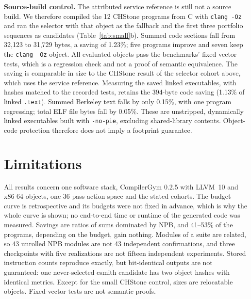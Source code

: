 \documentclass[conference,a4paper]{IEEEtran}
\begin{document}
\textbf{Source-build control.} The attributed service reference is
still not a source build. We therefore compiled the 12 CHStone programs
from C with \texttt{clang -Oz} and ran the selector with that object as
the fallback and the first three portfolio sequences as candidates
(Table~\ref{tab:small}b). Summed code sections fall from 32,123 to
31,729 bytes, a saving of 1.23\%; five programs improve and seven keep
the \texttt{clang -Oz} object. All evaluated objects pass the
benchmarks' fixed-vector tests, which is a regression check and not a
proof of semantic equivalence. The saving is comparable in size to the
CHStone result of the selector cohort above, which uses the service
reference. Measuring the saved linked executables, with hashes matched
to the recorded tests, retains the 394-byte code saving (1.13\% of linked
\texttt{.text}). Summed Berkeley text falls by only 0.15\%, with one
program regressing; total ELF file bytes fall by 0.05\%. These are
unstripped, dynamically linked executables built with \texttt{-no-pie},
excluding shared-library contents. Object-code protection therefore
does not imply a footprint guarantee.

\section{Limitations}
All results concern one software stack, CompilerGym 0.2.5 with LLVM~10
and x86-64 objects, one 36-pass action space and the stated cohorts.
The budget curve is retrospective and its budgets were not fixed in
advance, which is why the whole curve is shown; no end-to-end time or
runtime of the generated code was measured. Savings are ratios of sums
dominated by NPB, and 41--53\% of the programs, depending on the
budget, gain nothing. Modules
of a suite are related, so 43 unrolled NPB modules are not 43
independent confirmations, and three checkpoints with five realizations
are not fifteen independent experiments. Stored instruction counts
reproduce exactly, but bit-identical outputs are not guaranteed: one
never-selected csmith candidate has two object hashes with identical
metrics. Except for the small CHStone control, sizes are relocatable objects.
Fixed-vector tests
are not semantic proofs.
\end{document}
